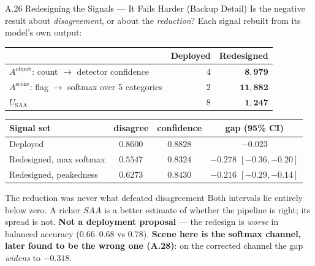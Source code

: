 \documentclass[aspectratio=169,11pt]{beamer}
\begin{document}
\begin{frame}{A.26 Redesigning the Signals --- It Fails Harder (Backup Detail)}
\scriptsize
Is the negative result about \emph{disagreement}, or about the \emph{reduction}? Each signal rebuilt from its model's own output:
\vspace{0.5mm}
\begin{center}\scriptsize
\begin{tabular}{@{}l r r@{}}
\toprule
& \textbf{Deployed} & \textbf{Redesigned} \\
\midrule
$A^{\text{object}}$: count $\rightarrow$ detector confidence & $4$ & $\mathbf{8{,}979}$ \\
$A^{\text{scene}}$: flag $\rightarrow$ softmax over 5 categories & $2$ & $\mathbf{11{,}882}$ \\
$U_{\text{SAA}}$ & $8$ & $\mathbf{1{,}247}$ \\
\bottomrule
\end{tabular}
\end{center}
\vspace{-1mm}
\begin{center}\scriptsize
\begin{tabular}{@{}l c c c@{}}
\toprule
\textbf{Signal set} & \textbf{disagree} & \textbf{confidence} & \textbf{gap (95\% CI)} \\
\midrule
Deployed & $0.8600$ & $0.8828$ & $-0.023$ \\
Redesigned, max softmax & $0.5547$ & $\mathbf{0.8324}$ & $\mathbf{-0.278}$ $[-0.36,-0.20]$ \\
Redesigned, peakedness & $0.6273$ & $\mathbf{0.8430}$ & $\mathbf{-0.216}$ $[-0.29,-0.14]$ \\
\bottomrule
\end{tabular}
\end{center}
\vspace{-2mm}
\begin{alertblock}{\scriptsize The reduction was never what defeated disagreement}
\scriptsize Both intervals lie entirely below zero. A richer $SAA$ is a better estimate of whether the pipeline is right; its spread is not. \textbf{Not a deployment proposal} --- the redesign is \emph{worse} in balanced accuracy ($0.66$--$0.68$ vs $0.78$). \textbf{Scene here is the softmax channel, later found to be the wrong one (A.28)}: on the corrected channel the gap \emph{widens} to $-0.318$.
\end{alertblock}
\end{frame}
\end{document}
